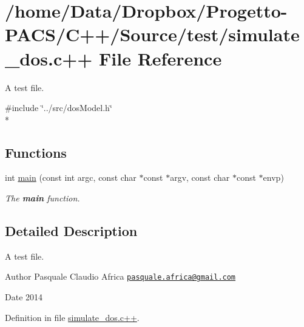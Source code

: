 \hypertarget{simulate__dos_8c_09_09}{\section{/home/\-Data/\-Dropbox/\-Progetto-\/\-P\-A\-C\-S/\-C++/\-Source/test/simulate\-\_\-dos.c++ File Reference}
\label{simulate__dos_8c_09_09}
}


A test file.  


{\ttfamily \#include \char`\"{}../src/dos\-Model.\-h\char`\"{}}\\*
\subsection*{Functions}
\begin{DoxyCompactItemize}
\item 
\hypertarget{simulate__dos_8c_09_09_abb42499d73e7c21855b75ac125b8da84}{int \hyperlink{simulate__dos_8c_09_09_abb42499d73e7c21855b75ac125b8da84}{main} (const int argc, const char $\ast$const $\ast$argv, const char $\ast$const $\ast$envp)}\label{simulate__dos_8c_09_09_abb42499d73e7c21855b75ac125b8da84}

\begin{DoxyCompactList}\small\item\em The {\bfseries main} function. \end{DoxyCompactList}\end{DoxyCompactItemize}


\subsection{Detailed Description}
A test file. \begin{DoxyAuthor}{Author}
Pasquale Claudio Africa \href{mailto:pasquale.africa@gmail.com}{\tt pasquale.\-africa@gmail.\-com} 
\end{DoxyAuthor}
\begin{DoxyDate}{Date}
2014 
\end{DoxyDate}


Definition in file \hyperlink{simulate__dos_8c_09_09_source}{simulate\-\_\-dos.\-c++}.

